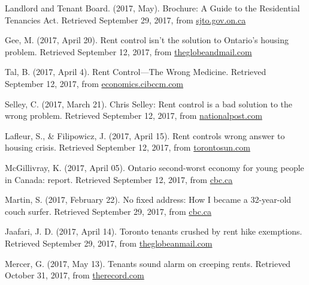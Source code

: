 \begin{thebibliography}{9}

 Landlord and Tenant Board. (2017, May). Brochure: A Guide to the Residential Tenancies Act. Retrieved September 29, 2017, from \href{http://www.sjto.gov.on.ca/documents/ltb/Brochures/Guide\%20to\%20RTA\%20(English).html}{sjto.gov.on.ca}

 Gee, M. (2017, April 20). Rent control isn't the solution to Ontario's housing problem. Retrieved September 12, 2017, from \href{https://beta.theglobeandmail.com/news/toronto/rent-control-isnt-the-solution-to-ontarios-housing-problem/article34753102/}{theglobeandmail.com}

 Tal, B. (2017, April 4). Rent Control—The Wrong Medicine. Retrieved September 12, 2017, from \href{https://economics.cibccm.com/economicsweb/cds?ID=2595&TYPE=EC_PDF}{economics.cibccm.com}

 Selley, C. (2017, March 21). Chris Selley: Rent control is a bad solution to the wrong problem. Retrieved September 12, 2017, from \href{http://nationalpost.com/news/toronto/chris-selley-rent-control-is-a-bad-solution-to-the-wrong-problem}{nationalpost.com}

 Lafleur, S., \& Filipowicz, J. (2017, April 15). Rent controls wrong answer to housing crisis. Retrieved September 12, 2017, from \href{http://www.torontosun.com/2017/04/15/rent-controls-wrong-answer-to-housing-crisis}{torontosun.com}

  McGillivray, K. (2017, April 05). Ontario second-worst economy for young people in Canada: report. Retrieved September 12, 2017, from \href{http://www.cbc.ca/news/canada/toronto/generation-squeeze-ontario-economy-1.4054589}{cbc.ca}
  
  Martin, S. (2017, February 22). No fixed address: How I became a 32-year-old couch surfer. Retrieved September 29, 2017, from \href{http://www.cbc.ca/news/canada/toronto/no-fixed-address-how-i-became-a-32-year-old-couch-surfer-1.3985771}{cbc.ca}

  Jaafari, J. D. (2017, April 14). Toronto tenants crushed by rent hike exemptions. Retrieved September 29, 2017, from \href{https://beta.theglobeandmail.com/news/toronto/toronto-tenants-crushed-by-rent-hike-exemptions/article33806825/}{theglobeanmail.com}

  Mercer, G. (2017, May 13). Tenants sound alarm on creeping rents. Retrieved October 31, 2017, from \href{https://www.therecord.com/news-story/7312772-tenants-sound-alarm-on-creeping-rents/}{therecord.com}


\end{thebibliography}
